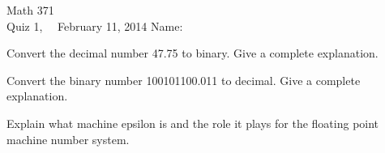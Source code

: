 \documentclass[addpoints, 11pt]{exam}
\begin{document}
Math 371 \\
Quiz 1, \ \ February 11, 2014
\hspace{2.in}
{Name:} {\underline {\hspace{2.15in}}} \\ \normalsize
\begin{questions}

\question[3] Convert the decimal number 47.75 to binary. Give a complete explanation. \vfill

\question[3] Convert the binary number 100101100.011 to decimal. Give a complete explanation.\vfill

\question[4] Explain what machine epsilon is and the role it plays for the floating point machine number system.\vfill

\end{questions}
\end{document}
